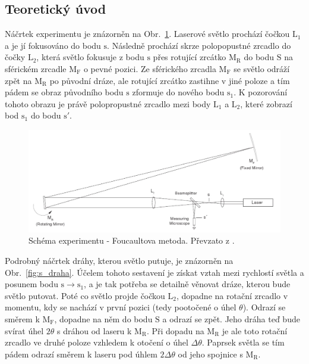 \documentclass[english]{article}
\newcommand{\bb}[1]{\boldmath{}\textbf{$\mathrm{#1}$}\unboldmath{}}
\begin{document}
	\subsection{Teoretický úvod}
			Náčrtek experimentu je znázorněn na Obr.~\ref{fig:s_fouc}. Laserové světlo prochází čočkou \bb{L_1} a je jí fokusováno do bodu \bb{s}. Následně prochází skrze polopopustné zrcadlo do čočky \bb{L_2}, která světlo fokusuje z bodu \bb{s} přes rotující zrcátko \bb{M_R} do bodu \bb{S} na sférickém zrcadle \bb{M_F} o pevné pozici. Ze sférického zrcadla \bb{M_F} se světlo odráží zpět na \bb{M_R} po původní dráze, ale rotující zrcátko zastihne v jiné poloze a tím pádem se obraz původního bodu \bb{s} zformuje do nového bodu \bb{s_1}. K pozorování tohoto obrazu je právě polopropustné zrcadlo mezi body \bb{L_1} a \bb{L_2}, které zobrazí bod \bb{s_1} do bodu \bb{s'}. 
			
				\begin{figure}[h!]
				\begin{center}
					\includegraphics[width=\linewidth]{att/zakl_schema.jpg}
					\caption{Schéma experimentu - Foucaultova metoda. Převzato z \cite{bib:zadani}.}
					\label{fig:s_fouc}
				\end{center}
				\end{figure}
			
			Podrobný náčrtek dráhy, kterou světlo putuje, je znázorněn na Obr.~\ref{fig:s_draha}. Účelem tohoto sestavení je získat vztah mezi rychlostí světla a posunem bodu \bb{s\rightarrow s_1}, a je tak potřeba se detailně věnovat dráze, kterou bude světlo putovat. Poté co světlo projde čočkou \bb{L_2}, dopadne na rotační zrcadlo v momentu, kdy se nachází v první pozici (tedy pootočené o úhel $\theta$). Odrazí se směrem k \bb{M_F}, dopadne na něm do bodu \bb{S} a odrazí se zpět. Jeho dráha teď bude svírat úhel $2\theta$ s dráhou od laseru k \bb{M_R}. Při dopadu na \bb{M_R} je ale toto rotační zrcadlo ve druhé poloze vzhledem k otočení o úhel $\Delta\theta$. Paprsek světla se tím pádem odrazí směrem k laseru pod úhlem $2\Delta\theta$ od jeho spojnice s \bb{M_R}. 
			
\end{document}
